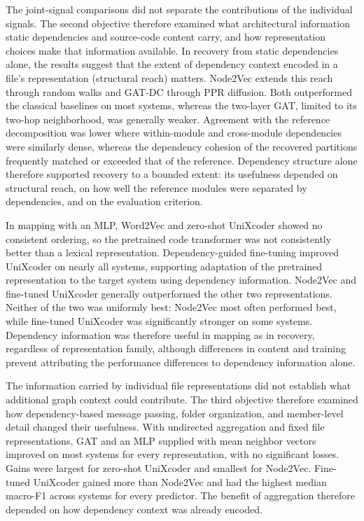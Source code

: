 The joint-signal comparisons did not separate the contributions of the individual signals. The second objective therefore examined what architectural information static dependencies and source-code content carry, and how representation choices make that information available. In recovery from static dependencies alone, the results suggest that the extent of dependency context encoded in a file's representation (structural reach) matters. Node2Vec extends this reach through random walks and GAT-DC through PPR diffusion. Both outperformed the classical baselines on most systems, whereas the two-layer GAT, limited to its two-hop neighborhood, was generally weaker. Agreement with the reference decomposition was lower where within-module and cross-module dependencies were similarly dense, whereas the dependency cohesion of the recovered partitions frequently matched or exceeded that of the reference. Dependency structure alone therefore supported recovery to a bounded extent: its usefulness depended on structural reach, on how well the reference modules were separated by dependencies, and on the evaluation criterion.

In mapping with an MLP, Word2Vec and zero-shot UniXcoder showed no consistent ordering, so the pretrained code transformer was not consistently better than a lexical representation. Dependency-guided fine-tuning improved UniXcoder on nearly all systems, supporting adaptation of the pretrained representation to the target system using dependency information. Node2Vec and fine-tuned UniXcoder generally outperformed the other two representations. Neither of the two was uniformly best: Node2Vec most often performed best, while fine-tuned UniXcoder was significantly stronger on some systems. Dependency information was therefore useful in mapping as in recovery, regardless of representation family, although differences in content and training prevent attributing the performance differences to dependency information alone.

The information carried by individual file representations did not establish what additional graph context could contribute. The third objective therefore examined how dependency-based message passing, folder organization, and member-level detail changed their usefulness. With undirected aggregation and fixed file representations, GAT and an MLP supplied with mean neighbor vectors improved on most systems for every representation, with no significant losses. Gains were largest for zero-shot UniXcoder and smallest for Node2Vec. Fine-tuned UniXcoder gained more than Node2Vec and had the highest median macro-F1 across systems for every predictor. The benefit of aggregation therefore depended on how dependency context was already encoded.

